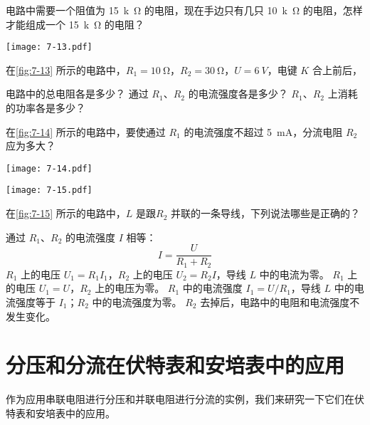 \begin{Practice}
\begin{question}
  \item 电路中需要一个阻值为 \qty{15}{k\ohm} 的电阻，现在手边只有几只 \qty{10}{k\ohm} 的电阻，怎样才能组成一个 \qty{15}{k\ohm} 的电阻？
  \begin{figurehere}
    \begin{minipage}{\linewidth}\centering
      \texttt{[image: 7-13.pdf]}
      \caption{}\label{fig:7-13}
    \end{minipage}
  \end{figurehere}	
  \item 在\cref{fig:7-13} 所示的电路中，$R_1=\qty{10}{\ohm}$，$R_2=\qty{30}{\ohm}$，$U=\qty{6}{V}$，电键 $K$ 合上前后，
  \begin{tasks}
    \task 电路中的总电阻各是多少？
    \task 通过 $R_1$、$R_2$ 的电流强度各是多少？
    \task $R_1$、$R_2$ 上消耗的功率各是多少？
  \end{tasks}
  \item 在\cref{fig:7-14} 所示的电路中，要使通过 $R_1$ 的电流强度不超过 \qty{5}{mA}，分流电阻 $R_2$ 应为多大？
  \begin{figurehere}
    \begin{minipage}[b]{0.48\linewidth}\centering
      \texttt{[image: 7-14.pdf]}
      \caption{}\label{fig:7-14}
    \end{minipage}
    \begin{minipage}[b]{0.48\linewidth}\centering
      \texttt{[image: 7-15.pdf]}
      \caption{}\label{fig:7-15}
    \end{minipage}
  \end{figurehere}
  \item 在\cref{fig:7-15} 所示的电路中，$L$ 是跟$ R_2$ 并联的一条导线，下列说法哪些是正确的？
  \begin{tasks}
    \task 通过 $R_1$、$R_2$ 的电流强度 $I$ 相等：
    \[I=\frac{U}{R_1+R_2} \]
    \task $R_1$ 上的电压 $U_1=R_1I_1$，$R_2$ 上的电压 $U_2=R_2I$，导线 $L$ 中的电流为零。
    \task $R_1$ 上的电压 $U_1=U$，$R_2$ 上的电压为零。
    \task $R_1$ 中的电流强度 $I_1=U/R_1$，导线 $L$ 中的电流强度等于 $I_1$；$R_2$ 中的电流强度为零。
    \task $R_2$ 去掉后，电路中的电阻和电流强度不发生变化。
  \end{tasks}
\end{question}
\end{Practice}


\section{分压和分流在伏特表和安培表中的应用}
作为应用串联电阻进行分压和并联电阻进行分流的实例，我们来研究一下它们在伏特表和安培表中的应用。

